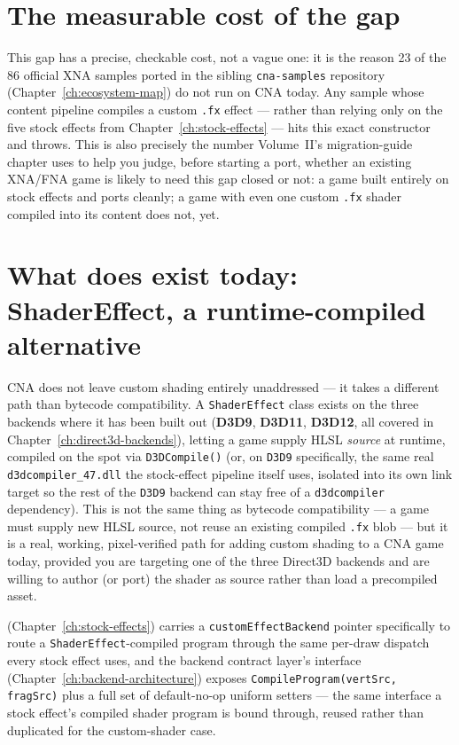 \section{The measurable cost of the gap}

This gap has a precise, checkable cost, not a vague one: it is the reason 23 of the 86
official XNA samples ported in the sibling \texttt{cna-samples} repository
(Chapter~\ref{ch:ecosystem-map}) do not run on CNA today. Any sample whose content pipeline
compiles a custom \texttt{.fx} effect --- rather than relying only on the five stock effects
from Chapter~\ref{ch:stock-effects} --- hits this exact constructor and throws. This is also
precisely the number Volume~II's migration-guide chapter uses to help you judge, before
starting a port, whether an existing XNA/FNA game is likely to need this gap closed or not:
a game built entirely on stock effects and  ports cleanly; a game with
even one custom \texttt{.fx} shader compiled into its content does not, yet.

\section{What does exist today: ShaderEffect, a runtime-compiled alternative}

CNA does not leave custom shading entirely unaddressed --- it takes a different path than
bytecode compatibility. A \texttt{ShaderEffect} class exists on the three backends where it
has been built out (\textbf{D3D9}, \textbf{D3D11}, \textbf{D3D12}, all covered in
Chapter~\ref{ch:direct3d-backends}), letting a game supply HLSL \emph{source} at runtime,
compiled on the spot via \texttt{D3DCompile()} (or, on \texttt{D3D9} specifically, the same
real \texttt{d3dcompiler\_47.dll} the stock-effect pipeline itself uses, isolated into its
own link target so the rest of the \texttt{D3D9} backend can stay free of a
\texttt{d3dcompiler} dependency). This is not the same thing as bytecode compatibility ---
a game must supply new HLSL source, not reuse an existing compiled \texttt{.fx} blob --- but
it is a real, working, pixel-verified path for adding custom shading to a CNA game today,
provided you are targeting one of the three Direct3D backends and are willing to author (or
port) the shader as source rather than load a precompiled asset.

 (Chapter~\ref{ch:stock-effects}) carries a
\texttt{customEffectBackend} pointer specifically to route a \texttt{ShaderEffect}-compiled
program through the same per-draw dispatch every stock effect uses, and the backend contract
layer's  interface (Chapter~\ref{ch:backend-architecture}) exposes
\texttt{CompileProgram(vertSrc, fragSrc)} plus a full set of default-no-op uniform setters ---
the same interface a stock effect's compiled shader program is bound through, reused rather
than duplicated for the custom-shader case.

